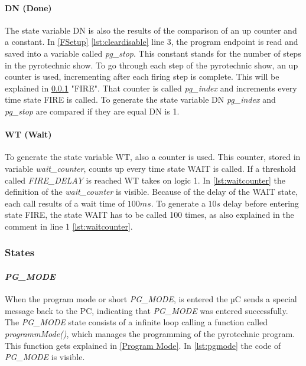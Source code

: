 \paragraph{DN (Done)}
The state variable DN is also the results of the comparison of an up counter and a constant. In \cref{FSetup} \cref{lst:cleardisable} line 3, the program endpoint is read and saved into a variable called \textit{pg\_stop}. This constant stands for the number of steps in the pyrotechnic show. To go through each step of the pyrotechnic show, an up counter is used, incrementing after each firing step is complete. This will be explained in \cref{States} "FIRE". That counter is called \textit{pg\_index} and increments every time state FIRE is called. To generate the state variable DN  \textit{pg\_index} and \textit{pg\_stop} are compared if they are equal DN is 1.

\paragraph{WT (Wait)}
To generate the state variable WT, also a counter is used. This counter, stored in variable \textit{wait\_counter}, counts up every time state WAIT is called. If a threshold called \textit{FIRE\_DELAY} is reached WT takes on logic 1. In \cref{lst:waitcounter} the definition of the \textit{wait\_counter} is visible. Because of the delay of the WAIT state, each call results of a wait time of $100ms$. To generate a $10s$ delay before entering state FIRE, the state WAIT has to be called 100 times, as also explained in the comment in line 1 \cref{lst:waitcounter}.



\pagebreak

\subsubsection{States}
\label{States}
\paragraph{\textit{PG\_MODE}}
When the program mode or short \textit{PG\_MODE}, is entered the µC sends a special message back to the PC, indicating that \textit{PG\_MODE} was entered successfully. The \textit{PG\_MODE} state consists of a infinite loop calling a function called \textit{programmMode()}, which manages the programming of the pyrotechnic program. This function gets explained in \cref{Program Mode}. In \cref{lst:pgmode} the code of \textit{PG\_MODE} is visible.\\

